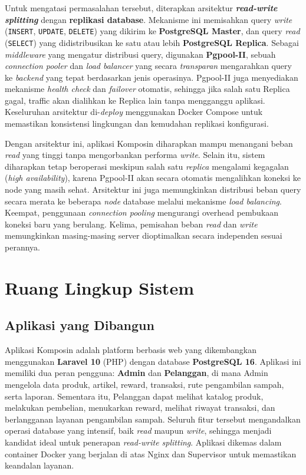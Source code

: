 Untuk mengatasi permasalahan tersebut, diterapkan arsitektur
\textbf{\textit{read-write splitting}} dengan \textbf{replikasi
database}. Mekanisme ini memisahkan query \textit{write}
(\texttt{INSERT}, \texttt{UPDATE}, \texttt{DELETE}) yang dikirim ke
\textbf{PostgreSQL Master}, dan query \textit{read} (\texttt{SELECT})
yang didistribusikan ke satu atau lebih \textbf{PostgreSQL Replica}.
Sebagai \textit{middleware} yang mengatur distribusi query, digunakan
\textbf{Pgpool-II}, sebuah \textit{connection pooler} dan
\textit{load balancer} yang secara \textit{transparan} mengarahkan
query ke \textit{backend} yang tepat berdasarkan jenis operasinya.
Pgpool-II juga menyediakan mekanisme \textit{health check} dan
\textit{failover} otomatis, sehingga jika salah satu Replica gagal,
traffic akan dialihkan ke Replica lain tanpa mengganggu aplikasi.
Keseluruhan arsitektur di-\textit{deploy} menggunakan Docker Compose
untuk memastikan konsistensi lingkungan dan kemudahan replikasi
konfigurasi.

Dengan arsitektur ini, aplikasi Komposin diharapkan mampu menangani
beban \textit{read} yang tinggi tanpa mengorbankan performa
\textit{write}. Selain itu, sistem diharapkan tetap beroperasi
meskipun salah satu \textit{replica} mengalami kegagalan
(\textit{high availability}), karena Pgpool-II akan secara otomatis
mengalihkan koneksi ke node yang masih sehat. Arsitektur ini juga
memungkinkan distribusi beban query secara merata ke beberapa
\textit{node} database melalui mekanisme \textit{load balancing}.
Keempat, penggunaan \textit{connection pooling} mengurangi overhead
pembukaan koneksi baru yang berulang. Kelima, pemisahan beban
\textit{read} dan \textit{write} memungkinkan masing-masing server
dioptimalkan secara independen sesuai perannya.

\section{Ruang Lingkup Sistem}

\subsection{Aplikasi yang Dibangun}

Aplikasi Komposin adalah platform berbasis web yang dikembangkan
menggunakan \textbf{Laravel 10} (PHP) dengan database
\textbf{PostgreSQL 16}. Aplikasi ini memiliki dua peran pengguna:
\textbf{Admin} dan \textbf{Pelanggan}, di mana Admin mengelola data
produk, artikel, reward, transaksi, rute pengambilan sampah, serta
laporan. Sementara itu, Pelanggan dapat melihat katalog produk,
melakukan pembelian, menukarkan reward, melihat riwayat transaksi, dan
berlangganan layanan pengambilan sampah. Seluruh fitur tersebut
mengandalkan operasi database yang intensif, baik \textit{read}
maupun \textit{write}, sehingga menjadi kandidat ideal untuk
penerapan \textit{read-write splitting}. Aplikasi dikemas dalam
container Docker yang berjalan di atas Nginx dan Supervisor untuk
memastikan keandalan layanan.

